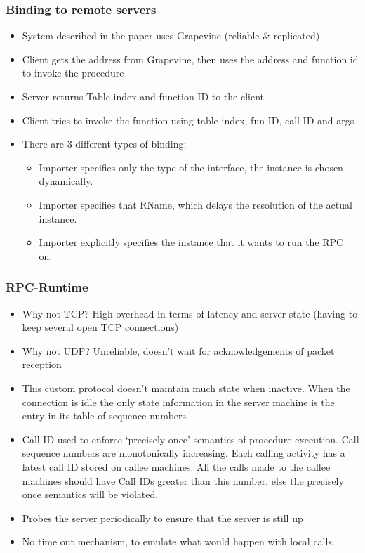 \documentclass[a4paper]{article}
\begin{document}
\subsubsection{Binding to remote servers}
\begin{itemize}
\item
    System described in the paper uses Grapevine (reliable \& replicated)
\item
    Client gets the address from Grapevine, then uses the address and
    function id to invoke the procedure
\item
    Server returns Table index and function ID to the client
\item
    Client tries to invoke the function using table index, fun ID, call ID
    and args
\item 
    There are 3 different types of binding:
    \begin{itemize}
        \item Importer specifies only the type of the interface, the instance is chosen dynamically.
        \item Importer specifies that RName, which delays the resolution of the actual instance.
        \item Importer explicitly specifies the instance that it wants to run the RPC on.
    \end{itemize}
\end{itemize}

\subsubsection{RPC-Runtime}

\begin{itemize}
\item
    Why not TCP? High overhead in terms of latency and server state (having to keep several open TCP connections)
\item
    Why not UDP? Unreliable, doesn't wait for acknowledgements of packet
    reception
\item
    This custom protocol doesn't maintain much state when inactive. When the connection is idle the only state information in the server machine is the entry in its table of sequence numbers
\item
    Call ID used to enforce `precisely once' semantics of procedure execution. Call sequence numbers are monotonically increasing. Each calling activity has a latest call ID stored on callee machines.
    All the calls made to the callee machines should have Call IDs greater than this number, else the precisely once semantics will be violated.
\item
    Probes the server periodically to ensure that the server is still up
\item
    No time out mechanism, to emulate what would happen with local calls.
\end{itemize}
\end{document}
